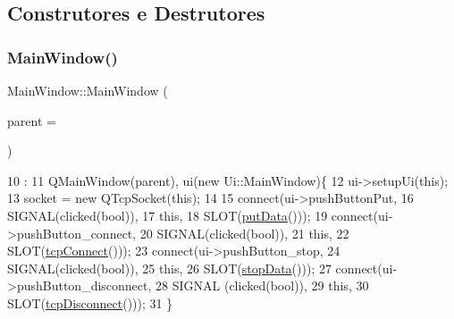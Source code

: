 \subsection{Construtores e Destrutores}
\mbox{\label{class_main_window_a8b244be8b7b7db1b08de2a2acb9409db}} 
\subsubsection{\texorpdfstring{Main\+Window()}{MainWindow()}}
{\footnotesize\ttfamily Main\+Window\+::\+Main\+Window (\begin{DoxyParamCaption}\item[{Q\+Widget $\ast$}]{parent = {} }\end{DoxyParamCaption})\hspace{0.3cm}{\ttfamily [explicit]}}


\begin{DoxyCode}
10                                       :
11     QMainWindow(parent), ui(\textcolor{keyword}{new} Ui::MainWindow)\{
12     ui->setupUi(\textcolor{keyword}{this});
13     socket = \textcolor{keyword}{new} QTcpSocket(\textcolor{keyword}{this});
14  
15     connect(ui->pushButtonPut,
16             SIGNAL(clicked(\textcolor{keywordtype}{bool})),
17             \textcolor{keyword}{this},
18             SLOT(\mbox{\hyperlink{class_main_window_afdfeb13ec363b0eb8ecacaf0aa13b605}{putData}}()));
19     connect(ui->pushButton\_connect,
20             SIGNAL(clicked(\textcolor{keywordtype}{bool})),
21             \textcolor{keyword}{this},
22             SLOT(\mbox{\hyperlink{class_main_window_ac5b669957c442b6eb68573dacfce33e1}{tcpConnect}}()));
23     connect(ui->pushButton\_stop,
24             SIGNAL(clicked(\textcolor{keywordtype}{bool})),
25             \textcolor{keyword}{this},
26             SLOT(\mbox{\hyperlink{class_main_window_a79fdaf1fd769f0584f50da34e415b3de}{stopData}}()));
27     connect(ui->pushButton\_disconnect,
28             SIGNAL (clicked(\textcolor{keywordtype}{bool})),
29             \textcolor{keyword}{this},
30             SLOT(\mbox{\hyperlink{class_main_window_a4d22c4c7afc7ba0a2fa4c70515c85dda}{tcpDisconnect}}()));
31 \}
\end{DoxyCode}
\mbox{\label{class_main_window_ae98d00a93bc118200eeef9f9bba1dba7}} 
